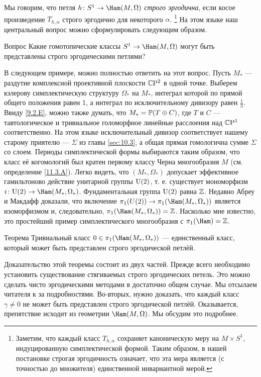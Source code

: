 Мы говорим, что петля $h\:S^1\to\Ham(M,\Omega)$ \emph{строго эргодична}, если косое произведение $T_{h,\alpha}$ строго эргодично
для некоторого $\alpha$.%
\footnote{Заметим, что каждый класс $T_{h,\alpha}$ сохраняет
  каноническую меру на $M \times S^1$, индуцированную симплектической
  формой.
Таким образом, в нашей постановке строгая эргодичность означает, что
эта мера является (с точностью до множителя) единственной инвариантной
мерой.} 
На этом языке наш центральный вопрос можно сформулировать следующим образом.

\begin{ex*}{Вопрос}
Какие гомотопические классы $S^1 \to \Ham(M, \Omega)$ могут быть
представлены строго эргодическими петлями? 
\end{ex*}

В следующем примере, можно полностью ответить на этот вопрос.
Пусть $M_\ast$ — раздутие комплексной проективной плоскости $\mathbb{C}\mathrm{P}^2$
в одной точке. 
Выберем кэлерову симплектическую структуру $\Omega_\ast$ на $M_\ast$,
интеграл которой по прямой общего положения равен 1, а интеграл по
исключительному дивизору равен $\tfrac13$. 
Ввиду \ref{9.2.E}, можно также думать, что $M_\ast = \mathbb{P}(T \oplus
C)$, где $T$ и $C$ — тавтологическое и тривиальное голоморфное
линейные расслоения над $\mathbb{C}\mathrm{P}^1$ соответственно. 
На этом языке исключительный дивизор соответствует нашему старому
приятелю — $\Sigma$ из главы \ref{sec:10.3}, а общая прямая гомологична
сумме $\Sigma$ со слоем. 
Периоды симплектической формы выбираются таким образом, что класс её
когомологий был кратен первому классу Черна многообразия $M$
(см. определение \ref{11.3.A}). 
Легко видеть, что $(M_\ast, \Omega_\ast)$ допускает эффективное
гамильтоново действие унитарной группы $\mathrm{U}(2)$, т. е. существует
мономорфизм $i\: \U(2) \to \Ham(M_\ast, \Omega_\ast)$. 
Фундаментальная группа $\mathrm{U}(2)$ равна $\mathbb{Z}$.
Недавно Абреу и Макдафф \cite{AM} доказали, что включение $\pi_1(U(2))
\to \pi_1 (\Ham(M_\ast, \Omega_\ast))$ является изоморфизмом и,
следовательно, $\pi_1(\Ham(M_\ast, \Omega_\ast)) = \ZZ$. 
Насколько мне известно, это простейший пример симплектического
многообразия с $\pi_1 (\Ham) = \ZZ$. 

\begin{thm}{Теорема}\label{11.1.A}
Тривиальный класс $0\in\pi_1(\Ham(M_\ast, \Omega_\ast))$ —
единственный класс, который может быть представлен строго эргодической
петлёй. 
\end{thm}

Доказательство этой теоремы состоит из двух частей.
Прежде всего необходимо установить существование стягиваемых строго
эргодических петель. 
Это можно сделать чисто эргодическими методами в достаточно общем случае.
Мы отсылаем читателя к \cite{P9} за подробностями.
Во-вторых, нужно доказать, что каждый класс $\gamma \ne 0$ не может
быть представлен строго эргодической петлёй. 
Оказывается, препятствие исходит из геометрии $\Ham(M, \Omega)$.
Мы обсудим это подробнее.

